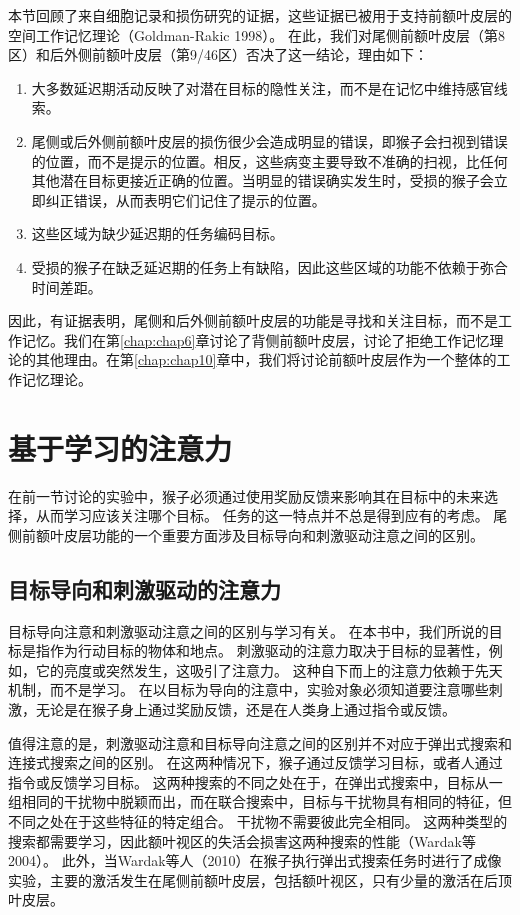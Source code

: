 本节回顾了来自细胞记录和损伤研究的证据，这些证据已被用于支持前额叶皮层的空间工作记忆理论（Goldman-Rakic 1998）。
在此，我们对尾侧前额叶皮层（第8区）和后外侧前额叶皮层（第9/46区）否决了这一结论，理由如下：

\begin{enumerate}
	\item 大多数延迟期活动反映了对潜在目标的隐性关注，而不是在记忆中维持感官线索。
	\item 尾侧或后外侧前额叶皮层的损伤很少会造成明显的错误，即猴子会扫视到错误的位置，而不是提示的位置。相反，这些病变主要导致不准确的扫视，比任何其他潜在目标更接近正确的位置。当明显的错误确实发生时，受损的猴子会立即纠正错误，从而表明它们记住了提示的位置。
	\item 这些区域为缺少延迟期的任务编码目标。
	\item 受损的猴子在缺乏延迟期的任务上有缺陷，因此这些区域的功能不依赖于弥合时间差距。
\end{enumerate}
因此，有证据表明，尾侧和后外侧前额叶皮层的功能是寻找和关注目标，而不是工作记忆。我们在第\ref{chap:chap6}章讨论了背侧前额叶皮层，讨论了拒绝工作记忆理论的其他理由。在第\ref{chap:chap10}章中，我们将讨论前额叶皮层作为一个整体的工作记忆理论。



\section{基于学习的注意力}

在前一节讨论的实验中，猴子必须通过使用奖励反馈来影响其在目标中的未来选择，从而学习应该关注哪个目标。
任务的这一特点并不总是得到应有的考虑。
尾侧前额叶皮层功能的一个重要方面涉及目标导向和刺激驱动注意之间的区别。


\subsection{目标导向和刺激驱动的注意力}

目标导向注意和刺激驱动注意之间的区别与学习有关。
在本书中，我们所说的目标是指作为行动目标的物体和地点。
刺激驱动的注意力取决于目标的显著性，例如，它的亮度或突然发生，这吸引了注意力。
这种自下而上的注意力依赖于先天机制，而不是学习。
在以目标为导向的注意中，实验对象必须知道要注意哪些刺激，无论是在猴子身上通过奖励反馈，还是在人类身上通过指令或反馈。


值得注意的是，刺激驱动注意和目标导向注意之间的区别并不对应于弹出式搜索和连接式搜索之间的区别。
在这两种情况下，猴子通过反馈学习目标，或者人通过指令或反馈学习目标。
这两种搜索的不同之处在于，在弹出式搜索中，目标从一组相同的干扰物中脱颖而出，而在联合搜索中，目标与干扰物具有相同的特征，但不同之处在于这些特征的特定组合。
干扰物不需要彼此完全相同。
这两种类型的搜索都需要学习，因此额叶视区的失活会损害这两种搜索的性能（Wardak等 2004）。
此外，当Wardak等人（2010）在猴子执行弹出式搜索任务时进行了成像实验，主要的激活发生在尾侧前额叶皮层，包括额叶视区，只有少量的激活在后顶叶皮层。


